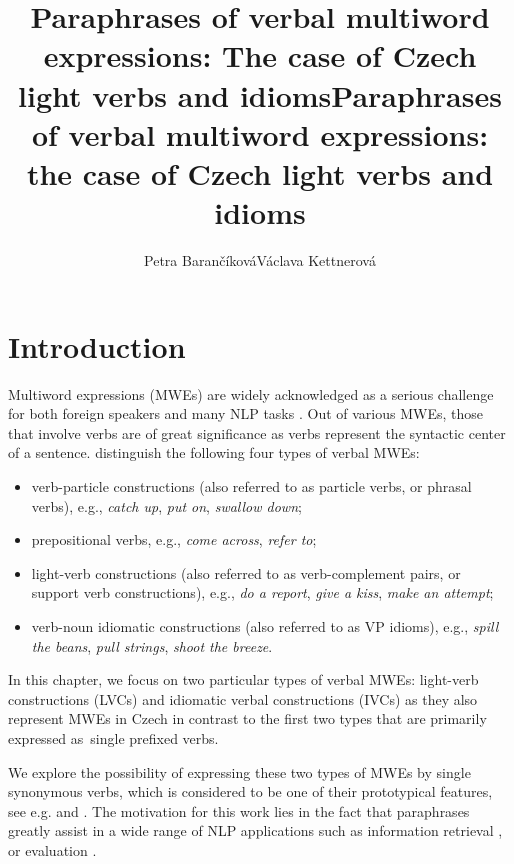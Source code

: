 \documentclass[output=paper,modfonts,nonflat]{langsci/langscibook}
\title{Paraphrases of verbal multiword expressions: The case of Czech light verbs and idioms}
\author{Petra Barančíková\affiliation{Charles University}\lastand    Václava Kettnerová\affiliation{Charles University} }
\title{Paraphrases of verbal multiword expressions: the case of Czech light verbs and idioms}
\begin{document}

\maketitle

\section{Introduction}

Multiword expressions (MWEs) are widely acknowledged as a serious challenge for 
both foreign speakers and many NLP tasks \citep{Sag2002a}. 
Out of various MWEs, those that involve verbs are of great significance 
as verbs represent the syntactic center of a sentence. \citet{baldwin2010multiword}
distinguish the following four types of verbal MWEs:

\begin{itemize}
\item 
verb-particle constructions (also referred to as particle verbs, or phrasal 
verbs), e.g., \textit{catch up}, \textit{put on}, \textit{swallow down};
\item
prepositional verbs, e.g., \textit{come across}, \textit{refer to};
\item
light-verb constructions (also referred to as verb-complement pairs, or support 
verb constructions), e.g., \textit{do a report}, \textit{give a kiss}, 
\textit{make an attempt}; %
\item
verb-noun idiomatic constructions (also referred to as VP idioms), e.g., 
\textit{spill the beans}, \textit{pull strings}, \textit{shoot the breeze}.
\end{itemize}


In this chapter, we focus on two particular types of  verbal MWEs: 
light-verb constructions (LVCs) and idiomatic verbal constructions (IVCs) as 
they also represent MWEs in Czech in contrast to the first two types that are 
primarily expressed as~single prefixed verbs. 

We explore the possibility of expressing these two types of MWEs by single 
synonymous verbs, which is considered to be one of their prototypical features, 
see e.g. \citet{chafe-68} and \citet{fillmore-88}. The motivation for this work 
lies in the fact that paraphrases greatly assist in a wide range of NLP 
applications such as information retrieval \citep{wallisinformation}, 
 \citep{Madnani:2013,Callison-Burch:2006,Marton:2009} 
or  evaluation \citep{Kauchak:2006,Zhou:2006,BaRoImprovingEvaluation2014}. 
\end{document}
